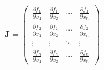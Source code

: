 \documentclass[preview]{standalone}
\begin{document}
\begin{equation*}
\mathbf{J} = 
 \begin{pmatrix}
  \frac{\partial f_1}{\partial x_1} & \frac{\partial f_1}{\partial x_2} & \cdots & \frac{\partial f_1}{\partial x_n} \\
  \frac{\partial f_2}{\partial x_1} & \frac{\partial f_2}{\partial x_2} & \cdots & \frac{\partial f_2}{\partial x_n} \\
  \vdots  & \vdots  & \ddots & \vdots  \\
  \frac{\partial f_n}{\partial x_1} & \frac{\partial f_n}{\partial x_2} & \cdots & \frac{\partial f_n}{\partial x_n} 
 \end{pmatrix}
\end{equation*}
\end{document}
